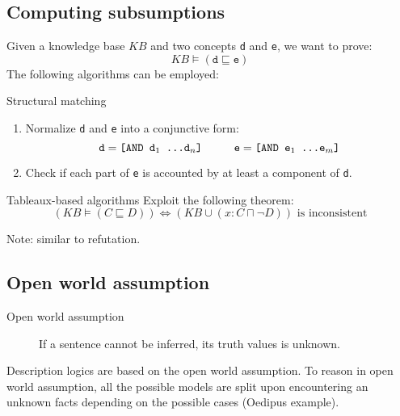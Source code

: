 \subsection{Computing subsumptions}

Given a knowledge base $KB$ and two concepts \texttt{d} and \texttt{e},
we want to prove:
\[ KB \models (\texttt{d} \sqsubseteq \texttt{e}) \]
The following algorithms can be employed:
\begin{descriptionlist}
    \item[Structural matching] 
        \phantom{}
        \begin{enumerate}
            \item Normalize \texttt{d} and \texttt{e} into a conjunctive form:
                \[ \texttt{d} = \texttt{[AND d$_1$ \dots d$_n$]} \hspace*{1cm} \texttt{e} = \texttt{[AND e$_1$ \dots e$_m$]} \]
            \item Check if each part of \texttt{e} is accounted by at least a component of \texttt{d}.
        \end{enumerate}
        
    \item[Tableaux-based algorithms] 
        Exploit the following theorem:
        \[ (KB \models (C \sqsubseteq D)) \iff (KB \cup (x : C \sqcap \lnot D)) \text{ is inconsistent} \]

        Note: similar to refutation.
\end{descriptionlist}


\subsection{Open world assumption}

\begin{description}
    \item[Open world assumption] 
        If a sentence cannot be inferred, its truth values is unknown.
\end{description}

Description logics are based on the open world assumption.
To reason in open world assumption, all the possible models are split upon encountering an unknown facts
depending on the possible cases (Oedipus example).



